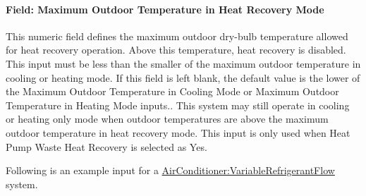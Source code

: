 \paragraph{Field: Maximum Outdoor Temperature in Heat Recovery Mode}\label{field-maximum-outdoor-temperature-in-heat-recovery-mode}

This numeric field defines the maximum outdoor dry-bulb temperature allowed for heat recovery operation. Above this temperature, heat recovery is disabled. This input must be less than the smaller of the maximum outdoor temperature in cooling or heating mode. If this field is left blank, the default value is the lower of the Maximum Outdoor Temperature in Cooling Mode or Maximum Outdoor Temperature in Heating Mode inputs.. This system may still operate in cooling or heating only mode when outdoor temperatures are above the maximum outdoor temperature in heat recovery mode. This input is only used when Heat Pump Waste Heat Recovery is selected as Yes.

Following is an example input for a \hyperref[airconditionervariablerefrigerantflow]{AirConditioner:VariableRefrigerantFlow} system.

